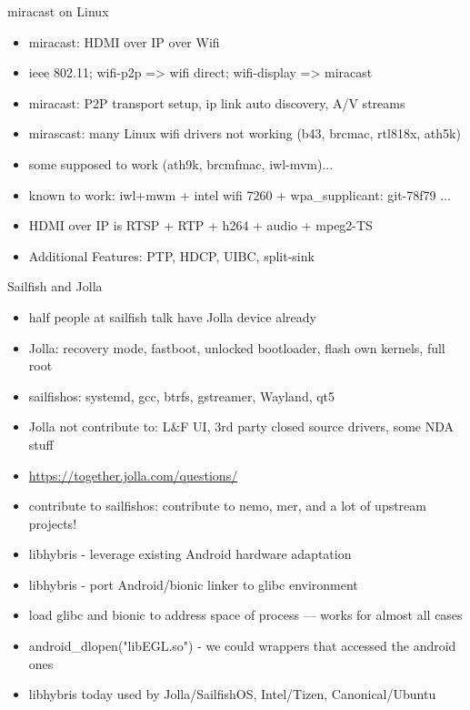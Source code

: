 \documentclass[aspectratio=169]{beamer}
\begin{document}
\begin{frame}{miracast on Linux}
  \begin{itemize}
  \item miracast: HDMI over IP over Wifi
  \item ieee 802.11; wifi-p2p => wifi direct; wifi-display => miracast
  \item miracast: P2P transport setup, ip link auto discovery, A/V streams
  \item mirascast: many Linux wifi drivers not working (b43, brcmac, rtl818x, ath5k)
  \item some supposed to work (ath9k, brcmfmac, iwl-mvm)...
  \item known to work: iwl+mwm + intel wifi 7260 + wpa\_supplicant: git-78f79 ...
  \item HDMI over IP is RTSP + RTP + h264 + audio + mpeg2-TS
  \item Additional Features: PTP, HDCP, UIBC, split-sink
  \end{itemize}
\end{frame}

\begin{frame}{Sailfish and Jolla}
  \begin{itemize}
  \item half people at sailfish talk have Jolla device already
  \item Jolla: recovery mode, fastboot, unlocked bootloader, flash own kernels, full root
  \item sailfishos: systemd, gcc, btrfs, gstreamer, Wayland, qt5
  \item Jolla not contribute to: L\&F UI, 3rd party closed source drivers, some NDA stuff
  \item \url{https://together.jolla.com/questions/} 
  \item contribute to sailfishos: contribute to nemo, mer, and a lot of upstream projects!
  \item libhybris - leverage existing Android hardware adaptation
  \item libhybris - port Android/bionic linker to glibc environment
  \item load glibc and bionic to address space of process --- works for almost all cases
  \item android\_dlopen("libEGL.so") - we could wrappers that accessed the android ones
  \item libhybris today used by Jolla/SailfishOS, Intel/Tizen, Canonical/Ubuntu
  \end{itemize}
\end{frame}  
  
\end{document}
